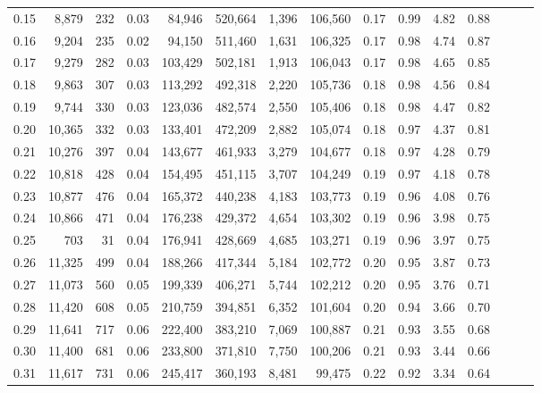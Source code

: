 \begin{tabular}{rrrrrrrrrrrrrrr}
0.15 &   8,879 &    232 &  0.03 &   84,946 &  520,664 &    1,396 &  106,560 &  0.17 &  0.99 &  4.82 &      0.88 \\
0.16 &   9,204 &    235 &  0.02 &   94,150 &  511,460 &    1,631 &  106,325 &  0.17 &  0.98 &  4.74 &      0.87 \\
0.17 &   9,279 &    282 &  0.03 &  103,429 &  502,181 &    1,913 &  106,043 &  0.17 &  0.98 &  4.65 &      0.85 \\
0.18 &   9,863 &    307 &  0.03 &  113,292 &  492,318 &    2,220 &  105,736 &  0.18 &  0.98 &  4.56 &      0.84 \\
0.19 &   9,744 &    330 &  0.03 &  123,036 &  482,574 &    2,550 &  105,406 &  0.18 &  0.98 &  4.47 &      0.82 \\
0.20 &  10,365 &    332 &  0.03 &  133,401 &  472,209 &    2,882 &  105,074 &  0.18 &  0.97 &  4.37 &      0.81 \\
0.21 &  10,276 &    397 &  0.04 &  143,677 &  461,933 &    3,279 &  104,677 &  0.18 &  0.97 &  4.28 &      0.79 \\
0.22 &  10,818 &    428 &  0.04 &  154,495 &  451,115 &    3,707 &  104,249 &  0.19 &  0.97 &  4.18 &      0.78 \\
0.23 &  10,877 &    476 &  0.04 &  165,372 &  440,238 &    4,183 &  103,773 &  0.19 &  0.96 &  4.08 &      0.76 \\
0.24 &  10,866 &    471 &  0.04 &  176,238 &  429,372 &    4,654 &  103,302 &  0.19 &  0.96 &  3.98 &      0.75 \\
0.25 &     703 &     31 &  0.04 &  176,941 &  428,669 &    4,685 &  103,271 &  0.19 &  0.96 &  3.97 &      0.75 \\
0.26 &  11,325 &    499 &  0.04 &  188,266 &  417,344 &    5,184 &  102,772 &  0.20 &  0.95 &  3.87 &      0.73 \\
0.27 &  11,073 &    560 &  0.05 &  199,339 &  406,271 &    5,744 &  102,212 &  0.20 &  0.95 &  3.76 &      0.71 \\
0.28 &  11,420 &    608 &  0.05 &  210,759 &  394,851 &    6,352 &  101,604 &  0.20 &  0.94 &  3.66 &      0.70 \\
0.29 &  11,641 &    717 &  0.06 &  222,400 &  383,210 &    7,069 &  100,887 &  0.21 &  0.93 &  3.55 &      0.68 \\
0.30 &  11,400 &    681 &  0.06 &  233,800 &  371,810 &    7,750 &  100,206 &  0.21 &  0.93 &  3.44 &      0.66 \\
0.31 &  11,617 &    731 &  0.06 &  245,417 &  360,193 &    8,481 &   99,475 &  0.22 &  0.92 &  3.34 &      0.64 \\

\end{tabular}
